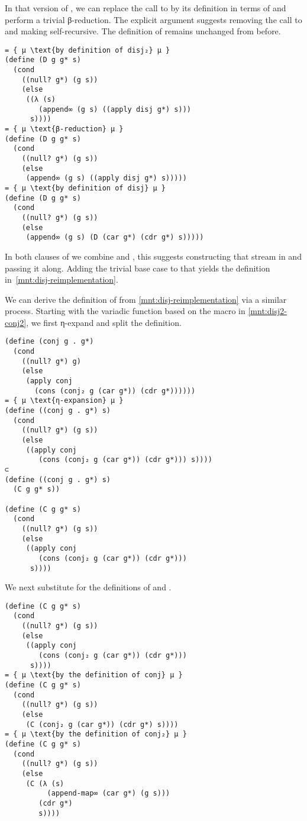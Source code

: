 \documentclass[sigplan,balance=true,pbalance=true,natbib=false]{acmart}
\begin{document}
In that version of , we can replace the call to
 by its definition in terms of 
and perform a trivial β-reduction. The explicit 
argument suggests removing the call to  and making
 self-recursive. The definition of 
remains unchanged from before.

\begin{verbatim}
= { µ \text{by definition of disj₂} µ }
(define (D g g* s)
  (cond
    ((null? g*) (g s))
    (else
     ((λ (s)
        (append∞ (g s) ((apply disj g*) s)))
      s))))
= { µ \text{β-reduction} µ }
(define (D g g* s)
  (cond
    ((null? g*) (g s))
    (else
     (append∞ (g s) ((apply disj g*) s)))))
= { µ \text{by definition of disj} µ }
(define (D g g* s)
  (cond
    ((null? g*) (g s))
    (else
     (append∞ (g s) (D (car g*) (cdr g*) s)))))
\end{verbatim}

In both clauses of  we combine  and
, this suggests constructing that stream in
 and passing it along. Adding the trivial base case
to that  yields the definition
in~\cref{mnt:disj-reimplementation}.

We can derive the definition of  from
\cref{mnt:disj-reimplementation} via a similar process. Starting with
the variadic function based on the macro in \cref{mnt:disj2-conj2}, we
first η-expand and split the definition.

\begin{verbatim}
(define (conj g . g*)
  (cond
    ((null? g*) g)
    (else
     (apply conj
       (cons (conj₂ g (car g*)) (cdr g*))))))
= { µ \text{η-expansion} µ }
(define ((conj g . g*) s)
  (cond
    ((null? g*) (g s))
    (else
     ((apply conj
        (cons (conj₂ g (car g*)) (cdr g*))) s))))
⊂
(define ((conj g . g*) s)
  (C g g* s))

(define (C g g* s)
  (cond
    ((null? g*) (g s))
    (else
     ((apply conj
        (cons (conj₂ g (car g*)) (cdr g*)))
      s))))
\end{verbatim}

\noindent We next substitute for the definitions of 
and .

\begin{verbatim}
(define (C g g* s)
  (cond
    ((null? g*) (g s))
    (else
     ((apply conj
        (cons (conj₂ g (car g*)) (cdr g*)))
      s))))
= { µ \text{by the definition of conj} µ }
(define (C g g* s)
  (cond
    ((null? g*) (g s))
    (else
     (C (conj₂ g (car g*)) (cdr g*) s))))
= { µ \text{by the definition of conj₂} µ }
(define (C g g* s)
  (cond
    ((null? g*) (g s))
    (else
     (C (λ (s)
          (append-map∞ (car g*) (g s)))
        (cdr g*)
        s))))
\end{verbatim}
\end{document}
